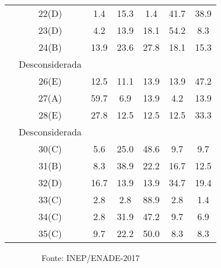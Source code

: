 \documentclass[12pt]{article}
\begin{document}
\begin{table}[h]
\begin{tabular}{l|c|c|c|c|c|c}
               & 22(D)      & 1.4   &  15.3 &  1.4  & 41.7  & 38.9 \\
               & 23(D)      & 4.2   &  13.9 &  18.1 & 54.2  & 8.3 \\          
               & 24(B)      & 13.9  &  23.6 &  27.8 & 18.1  & 15.3 \\
               & Desconsiderada      &       &       &       &       &       \\
               & 26(E)      & 12.5  &  11.1 &  13.9 &  13.9 & 47.2 \\              
               & 27(A)      & 59.7  &  6.9  &  13.9 &  4.2  & 13.9 \\
               & 28(E)      & 27.8  &  12.5 &  12.5 &  12.5 & 33.3 \\
               & Desconsiderada      &       &       &       &       &  \\
               & 30(C)      & 5.6   &  25.0 &  48.6 &  9.7  & 9.7 \\
               & 31(B)      & 8.3   &  38.9 &  22.2 &  16.7 & 12.5 \\
               & 32(D)      & 16.7  &  13.9 &  13.9 &  34.7 & 19.4 \\
               & 33(C)      & 2.8   &  2.8  &  88.9 &  2.8  & 1.4 \\
               & 34(C)      & 2.8   &  31.9 &  47.2 &  9.7  & 6.9 \\
               & 35(C)      & 9.7   &  22.2 &  50.0 &  8.3  & 8.3 \\
\hline\hline
\end{tabular}
\vskip0.2cm
\begin{flushleft}
\ \ \ \ \ \ \ \ \ Fonte: INEP/ENADE-2017
\end{flushleft}
\end{table}







\newpage
\end{document}
